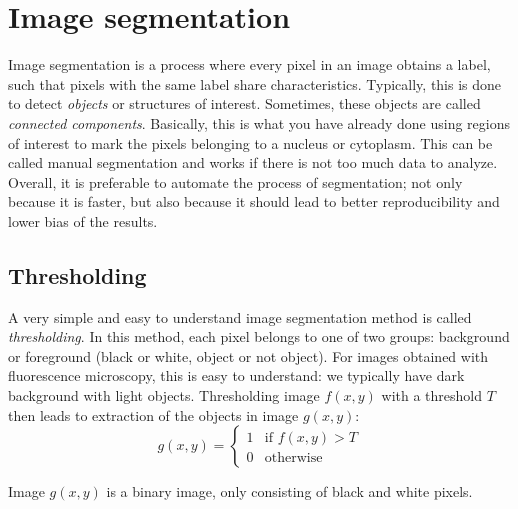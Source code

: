 \section{Image segmentation}

Image segmentation is a process where every pixel in an image obtains a label, such that pixels with the same label share characteristics. Typically, this is done to detect \emph{objects} or structures of interest. Sometimes, these objects are called \emph{connected components}. Basically, this is what you have already done using regions of interest to mark the pixels belonging to a nucleus or cytoplasm. This can be called manual segmentation and works if there is not too much data to analyze. Overall, it is preferable to automate the process of segmentation; not only because it is faster, but also because it should lead to better reproducibility and lower bias of the results. 

\subsection{Thresholding}

A very simple and easy to understand image segmentation method is called \emph{thresholding}. In this method, each pixel belongs to one of two groups: background or foreground (black or white, object or not object). For images obtained with fluorescence microscopy, this is easy to understand: we typically have dark background with light objects. Thresholding image $f\left(x,y\right)$ with a threshold $T$ then leads to extraction of the objects in image $g\left(x,y\right)$:
	\[
		g\left(x,y\right)=\begin{cases}
		1 &\text{if } f\left(x,y\right)>T\\
		0 &\text{otherwise}
			\end{cases}
\]

Image $g\left(x,y\right)$ is a binary image, only consisting of black and white pixels.

